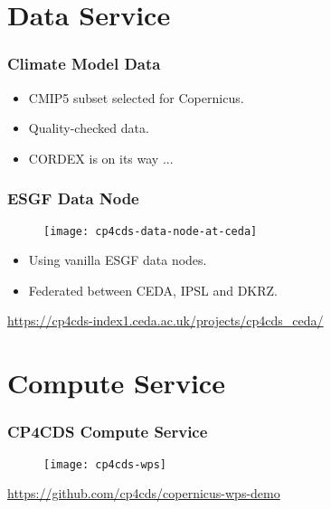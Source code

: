 \documentclass{beamer}
\begin{document}
\section{Data Service}

\begin{frame}
\frametitle<presentation>{Climate Model Data}

  \begin{itemize}
    \item CMIP5 subset selected for Copernicus.
    \item Quality-checked data.
    \item CORDEX is on its way ...
  \end{itemize}

\end{frame}

\begin{frame}
\frametitle<presentation>{ESGF Data Node}

  \begin{figure}[ht]
    \centering
    \texttt{[image: cp4cds-data-node-at-ceda]}
  \end{figure}

  \begin{itemize}
    \item Using vanilla ESGF data nodes.
    \item Federated between CEDA, IPSL and DKRZ.
  \end{itemize}

  \centering
  \footnotesize{\url{https://cp4cds-index1.ceda.ac.uk/projects/cp4cds_ceda/}}

\end{frame}

\section{Compute Service}

\begin{frame}
\frametitle<presentation>{CP4CDS Compute Service}

  \begin{figure}[ht]
    \centering
    \texttt{[image: cp4cds-wps]}
  \end{figure}

  \centering
  \footnotesize{\url{https://github.com/cp4cds/copernicus-wps-demo}}

\end{frame}
\end{document}
